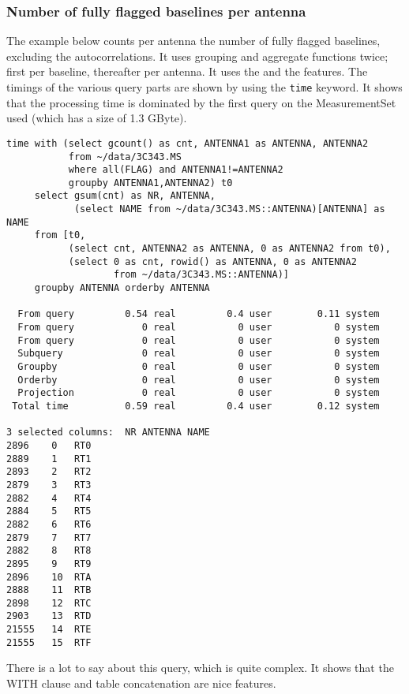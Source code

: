 \subsubsection{Number of fully flagged baselines per antenna}
The example below counts per antenna the number of fully
flagged baselines, excluding the autocorrelations. It uses grouping
and aggregate functions twice; first per baseline, thereafter per
antenna.
It uses the  and the
 features. The timings of the
various query parts are shown
by using the {\tt time} keyword. It shows that the
processing time is dominated by the first query on the
MeasurementSet used (which has a size of 1.3 GByte).
\begin{verbatim}
time with (select gcount() as cnt, ANTENNA1 as ANTENNA, ANTENNA2
           from ~/data/3C343.MS
           where all(FLAG) and ANTENNA1!=ANTENNA2
           groupby ANTENNA1,ANTENNA2) t0
     select gsum(cnt) as NR, ANTENNA,
            (select NAME from ~/data/3C343.MS::ANTENNA)[ANTENNA] as NAME
     from [t0,
           (select cnt, ANTENNA2 as ANTENNA, 0 as ANTENNA2 from t0),
           (select 0 as cnt, rowid() as ANTENNA, 0 as ANTENNA2
                   from ~/data/3C343.MS::ANTENNA)]
     groupby ANTENNA orderby ANTENNA

  From query         0.54 real         0.4 user        0.11 system
  From query            0 real           0 user           0 system
  From query            0 real           0 user           0 system
  Subquery              0 real           0 user           0 system
  Groupby               0 real           0 user           0 system
  Orderby               0 real           0 user           0 system
  Projection            0 real           0 user           0 system
 Total time          0.59 real         0.4 user        0.12 system

3 selected columns:  NR ANTENNA NAME
2896	0	RT0
2889	1	RT1
2893	2	RT2
2879	3	RT3
2882	4	RT4
2884	5	RT5
2882	6	RT6
2879	7	RT7
2882	8	RT8
2895	9	RT9
2896	10	RTA
2888	11	RTB
2898	12	RTC
2903	13	RTD
21555	14	RTE
21555	15	RTF
\end{verbatim}
There is a lot to say about this query, which is quite complex. It
shows that the WITH clause and table concatenation are nice features.
